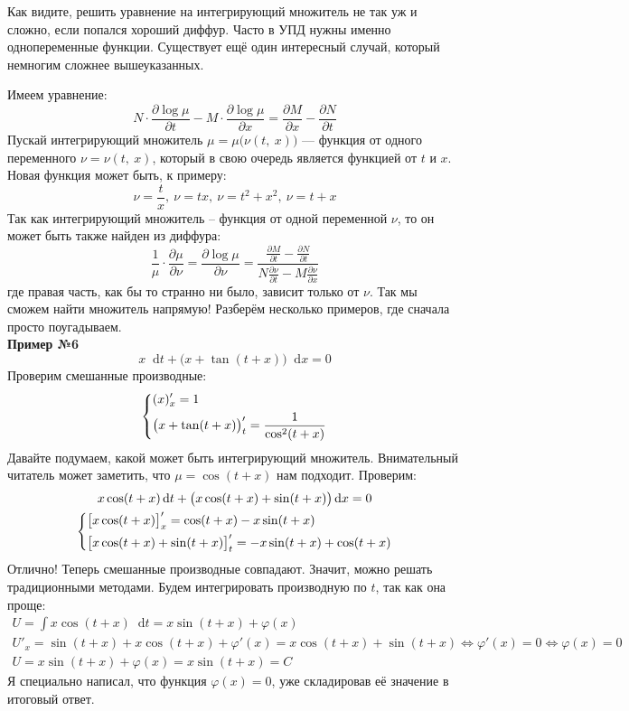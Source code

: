 \documentclass[a4paper,12pt]{article}
\renewcommand*\d{\mathop{}\!\mathrm{d}}
\newcommand{\fe}{\varphi}
\newcommand{\ds}{\displaystyle}
\begin{document}
Как видите, решить уравнение на интегрирующий множитель не так уж и сложно, если попался хороший диффур. Часто в УПД нужны именно однопеременные функции. Существует ещё один интересный случай, который немногим сложнее вышеуказанных.

Имеем уравнение:
\[N\cdot\dfrac{\partial \log\mu}{\partial t} - M \cdot \dfrac{\partial \log\mu}{\partial x} = \dfrac{\partial M}{\partial x} - \dfrac{\partial N}{\partial t}\]
Пускай интегрирующий множитель $\mu = \mu\big(\nu(t,\ x)\big)$ --- функция от одного переменного $\nu = \nu(t,\ x)$, который в свою очередь является функцией от $t$ и $x$. Новая функция может быть, к примеру:
\[\nu = \dfrac{t}{x},\ \nu = tx,\ \nu = t^2 + x^2,\ \nu = t + x\]
Так как интегрирующий множитель -- функция от одной переменной $\nu$, то он может быть также найден из диффура:
\[\dfrac{1}{\mu} \cdot \dfrac{\partial \mu}{\partial \nu} =  \dfrac{\partial \log\mu}{\partial \nu} =  \dfrac{\frac{\partial M}{\partial t} - \frac{\partial N}{\partial t}}{N \frac{\partial\nu}{\partial t} - M\frac{\partial \nu}{\partial x}}\]
где правая часть, как бы то странно ни было, зависит только от $\nu$. Так мы сможем найти множитель напрямую! Разберём несколько примеров, где сначала просто поугадываем.
\ \\

\textbf{Пример №6}
\[x\d t + \big(x + \tan(t + x)\big)\d x = 0\]
Проверим смешанные производные:
\[\left\{\begin{gathered}
(x)'_x = 1\hfill\\
\big(x + \tan(t + x)\big)'_t = \dfrac{1}{\cos[2](t + x)}\hfill
\end{gathered}\right.\]
Давайте подумаем, какой может быть интегрирующий множитель. Внимательный читатель может заметить, что $\mu = \cos(t + x)$ нам подходит. Проверим:
\begin{gather*}
	x\cos(t + x)\d t + \big(x\cos(t + x) + \sin(t + x)\big)\d x = 0\\	\left\{\begin{gathered}\big[x\cos(t + x)\big]'_x = \cos(t + x) - x\sin(t + x)\hfill\\
	\big[x\cos(t + x) + \sin(t + x)\big]'_t = -x\sin(t + x) + \cos(t + x)\hfill
	\end{gathered}\right.
\end{gather*}
Отлично! Теперь смешанные производные совпадают. Значит, можно решать традиционными методами. Будем интегрировать производную по $t$, так как она проще:
\begin{gather*}
	U = \ds\int x\cos(t + x)\d t = x\sin(t + x) + \fe(x)\\
	U'_x = \sin(t + x) + x\cos(t + x) + \fe'(x) = x\cos(t + x) + \sin(t + x) \iff \fe'(x) = 0 \iff \fe(x) = 0\\
	U = x\sin(t + x) + \fe(x) = x\sin(t + x) = C
\end{gather*}
Я специально написал, что функция $\fe(x) = 0$, уже складировав её значение в итоговый ответ.
\ \\
\end{document}
